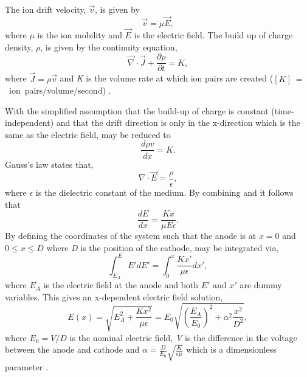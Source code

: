 The ion drift velocity, $\vec v$, is given by
\begin{equation}
    \vec v = \mu \vec E,
\end{equation}
where $\mu$ is the ion mobility and $\vec E$ is the electric field. The build up of charge density, $\rho$, is given by the continuity equation,
\begin{equation}
    \vec \nabla \cdot \vec J + \frac{\partial \rho}{\partial t} = K,
\label{eq:space_charge_continuity}
\end{equation}
where $\vec J = \rho \vec v$ and \textit{K} is the volume rate at which ion pairs are created \newline ($[K]~=~$~ion~pairs/volume/second) \cite{space_charge_math}. 

With the simplified assumption that the build-up of charge is constant (time-independent) and that the drift direction is only in the x-direction which is the same as the electric field,  may be reduced to 
\begin{equation}
    \frac{d \rho v}{dx} = K.
\label{eq:reduced_sapce_charge_continuity}
\end{equation}
Gauss's law states that,
\begin{equation}
    \nabla \cdot \vec E = \frac{\rho}{\epsilon},
\label{eq:Gauss's_law}
\end{equation}
where $\epsilon$ is the dielectric constant of the medium.
By combining  and  it follows that
\begin{equation}
    \frac{dE}{dx} = \frac{Kx}{\mu E \epsilon}.
\label{eq:sc_gauss_combo}
\end{equation}
By defining the coordinates of the system such that the anode is at $x = 0$ and $0 \leq x \leq D$ where \textit{D} is the position of the cathode,  may be integrated via,
\begin{equation}
    \int_{E_A}^E E'dE' = \int_0^x \frac{Kx'}{\mu \epsilon}dx',
\end{equation}
where $E_A$ is the electric field at the anode and both $E'$ and $x'$ are dummy variables. This gives an x-dependent electric field solution,
\begin{equation}
    E(x) = \sqrt{E^2_A + \frac{Kx^2}{\mu \epsilon}} = E_0 \sqrt{\left (\frac{E_A}{E_0}\right ) ^2 + \alpha^2 \frac{x^2}{D^2}},
\end{equation}
where $E_0 = V/D$ is the nominal electric field, \textit{V} is the difference in the voltage between the anode and cathode and $\alpha = \frac{D}{E_0}\sqrt{\frac{K}{\epsilon \mu}}$ which is a dimensionless parameter \cite{space_charge_math}.



